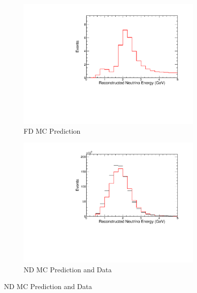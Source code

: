 {\begin{figure}
\begin{center}
\begin{subfigure}[c]{0.49\textwidth}
\includegraphics[width=\textwidth]{figures/systs/prediction/fd_mc_prediction_trkLenFD.pdf}
\caption*{FD MC Prediction}
\end{subfigure}
\begin{subfigure}[c]{0.49\textwidth}
\includegraphics[width=\textwidth]{figures/systs/prediction/nd_mc_prediction_trkLenFD.pdf}
\caption*{ND MC Prediction and Data}
\end{subfigure}

\vspace{20pt}


\end{center}
\end{figure}}
